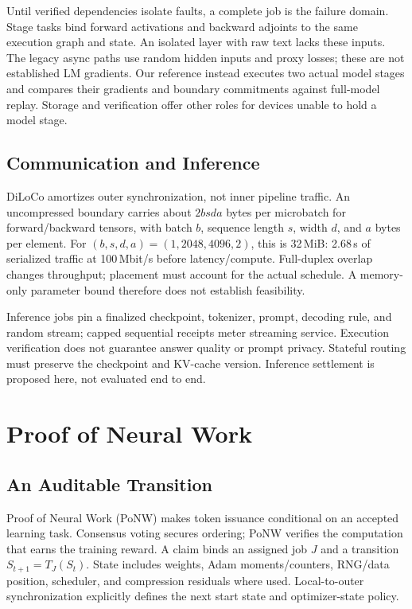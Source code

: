 \documentclass[conference]{IEEEtran}
\begin{document}
Until verified dependencies isolate faults, a complete job is the failure domain. Stage tasks bind forward activations and backward adjoints to the same execution graph and state. An isolated layer with raw text lacks these inputs. The legacy async paths use random hidden inputs and proxy losses; these are not established LM gradients. Our reference instead executes two actual model stages and compares their gradients and boundary commitments against full-model replay. Storage and verification offer other roles for devices unable to hold a model stage.

\subsection{Communication and Inference}

DiLoCo amortizes outer synchronization, not inner pipeline traffic. An uncompressed boundary carries about $2bsd a$ bytes per microbatch for forward/backward tensors, with batch $b$, sequence length $s$, width $d$, and $a$ bytes per element. For $(b,s,d,a)=(1,2048,4096,2)$, this is 32\,MiB: 2.68\,s of serialized traffic at 100\,Mbit/s before latency/compute. Full-duplex overlap changes throughput; placement must account for the actual schedule. A memory-only parameter bound therefore does not establish feasibility.

Inference jobs pin a finalized checkpoint, tokenizer, prompt, decoding rule, and random stream; capped sequential receipts meter streaming service. Execution verification does not guarantee answer quality or prompt privacy. Stateful routing must preserve the checkpoint and KV-cache version. Inference settlement is proposed here, not evaluated end to end.

\section{Proof of Neural Work}
\label{sec:ponw}

\subsection{An Auditable Transition}

Proof of Neural Work (PoNW) makes token issuance conditional on an accepted learning task. Consensus voting secures ordering; PoNW verifies the computation that earns the training reward. A claim binds an assigned job $J$ and a transition $S_{t+1}=T_J(S_t)$. State includes weights, Adam moments/counters, RNG/data position, scheduler, and compression residuals where used. Local-to-outer synchronization explicitly defines the next start state and optimizer-state policy.
\end{document}
